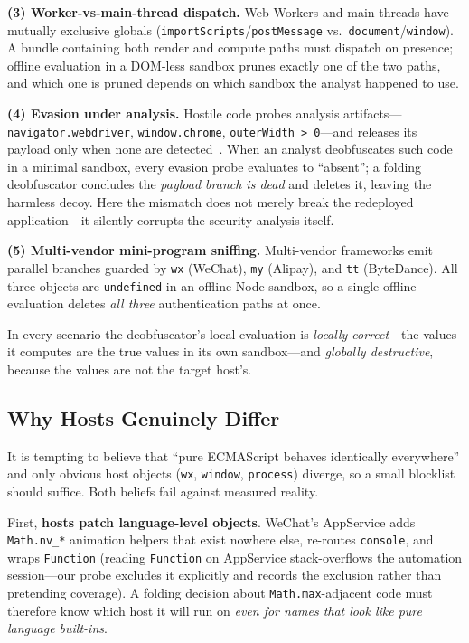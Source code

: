 \documentclass[sigconf,nonacm]{acmart}
\begin{document}
\textbf{(3) Worker-vs-main-thread dispatch.} Web Workers and main threads have mutually exclusive globals (\texttt{importScripts}/\texttt{postMessage} vs.\ \texttt{document}/\texttt{window}). A bundle containing both render and compute paths must dispatch on presence; offline evaluation in a DOM-less sandbox prunes exactly one of the two paths, and which one is pruned depends on which sandbox the analyst happened to use.

\textbf{(4) Evasion under analysis.} Hostile code probes analysis artifacts---\texttt{navigator.webdriver}, \texttt{window.chrome}, \texttt{outerWidth > 0}---and releases its payload only when none are detected~\cite{fv8}. When an analyst deobfuscates such code in a minimal sandbox, every evasion probe evaluates to ``absent''; a folding deobfuscator concludes the \emph{payload branch is dead} and deletes it, leaving the harmless decoy. Here the mismatch does not merely break the redeployed application---it silently corrupts the security analysis itself.

\textbf{(5) Multi-vendor mini-program sniffing.} Multi-vendor frameworks emit parallel branches guarded by \texttt{wx} (WeChat), \texttt{my} (Alipay), and \texttt{tt} (ByteDance). All three objects are \texttt{undefined} in an offline Node sandbox, so a single offline evaluation deletes \emph{all three} authentication paths at once.

In every scenario the deobfuscator's local evaluation is \emph{locally correct}---the values it computes are the true values in its own sandbox---and \emph{globally destructive}, because the values are not the target host's.

\subsection{Why Hosts Genuinely Differ}

It is tempting to believe that ``pure ECMAScript behaves identically everywhere'' and only obvious host objects (\texttt{wx}, \texttt{window}, \texttt{process}) diverge, so a small blocklist should suffice. Both beliefs fail against measured reality.

First, \textbf{hosts patch language-level objects}. WeChat's AppService adds \texttt{Math.nv\_*} animation helpers that exist nowhere else, re-routes \texttt{console}, and wraps \texttt{Function} (reading \texttt{Function} on AppService stack-overflows the automation session---our probe excludes it explicitly and records the exclusion rather than pretending coverage). A folding decision about \texttt{Math.max}-adjacent code must therefore know which host it will run on \emph{even for names that look like pure language built-ins}.
\end{document}
